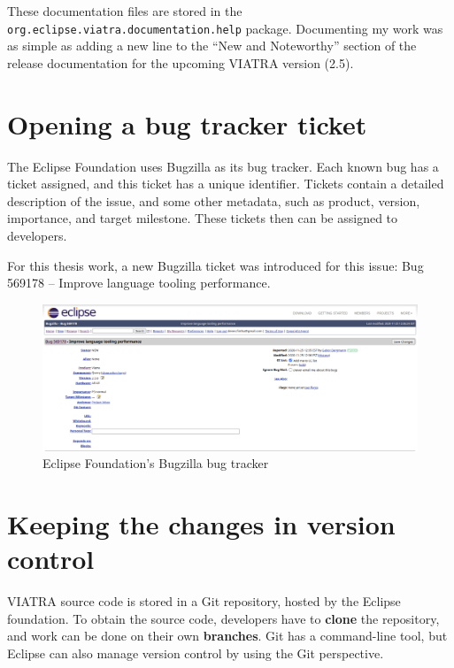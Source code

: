 \documentclass[11pt,a4paper,oneside]{report}
\begin{document}
These documentation files are stored in the
\texttt{org.eclipse.viatra.documentation.help} package. Documenting my work was
as simple as adding a new line to the ``New and Noteworthy'' section of the
release documentation for the upcoming VIATRA version (2.5).

\section{Opening a bug tracker ticket}
The Eclipse Foundation uses Bugzilla as its bug tracker. Each known bug has a
ticket assigned, and this ticket has a unique identifier. Tickets contain
a detailed description of the issue, and some other metadata, such as product,
version, importance, and target milestone. These tickets then can be assigned to
developers.

For this thesis work, a new Bugzilla ticket was introduced for this issue:
Bug 569178 -- Improve language tooling performance.

\begin{figure}[ht]
\centering
\includegraphics[width=150mm, keepaspectratio]{figures/bugzilla.png}
\caption{Eclipse Foundation's Bugzilla bug tracker}
\label{fig:bugzilla}
\end{figure}

\section{Keeping the changes in version control}
VIATRA source code is stored in a Git repository, hosted by the Eclipse
foundation. To obtain the source code, developers have to \textbf{clone} the
repository, and work can be done on their own \textbf{branches}. Git has a
command-line tool, but Eclipse can also manage version control by using the
Git perspective.
\end{document}
